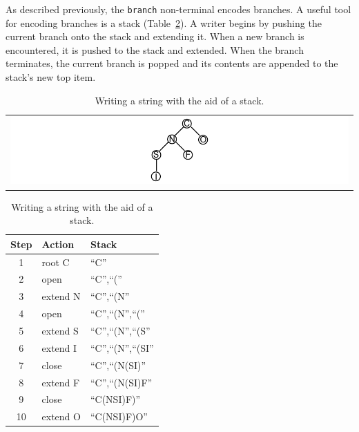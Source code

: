 \documentclass{article}
\def\ttt{\texttt}
\begin{document}
As described previously, the \ttt{branch} non-terminal encodes branches. A useful tool for encoding branches is a stack (Table~\ref{table:stack-for-writing-string}). A writer begins by pushing the current branch onto the stack and extending it. When a new branch is encountered, it is pushed to the stack and extended. When the branch terminates, the current branch is popped and its contents are appended to the stack's new top item.

\begin{table}
    \caption{Writing a string with the aid of a stack.}
    \centering
    \begin{tabular}{c}
        \includegraphics[width=\columnwidth]{tree-for-stack.pdf}
    \end{tabular}

    \bigskip

    \begin{tabular}{c l l}
        \hline
        Step & Action & Stack \\
        \hline
        1  & root C   & \enquote{C}                             \\
        2  & open     & \enquote{C},\enquote{(}                 \\
        3  & extend N & \enquote{C},\enquote{(N}                \\
        4  & open     & \enquote{C},\enquote{(N},\enquote{(}    \\
        5  & extend S & \enquote{C},\enquote{(N},\enquote{(S}   \\
        6  & extend I & \enquote{C},\enquote{(N},\enquote{(SI}  \\
        7  & close    & \enquote{C},\enquote{(N(SI)}            \\
        8  & extend F & \enquote{C},\enquote{(N(SI)F}           \\
        9  & close    & \enquote{C(NSI)F)}                      \\
        10 & extend O & \enquote{C(NSI)F)O}                     \\
        \hline
    \end{tabular}
    \label{table:stack-for-writing-string}
\end{table}
\end{document}
